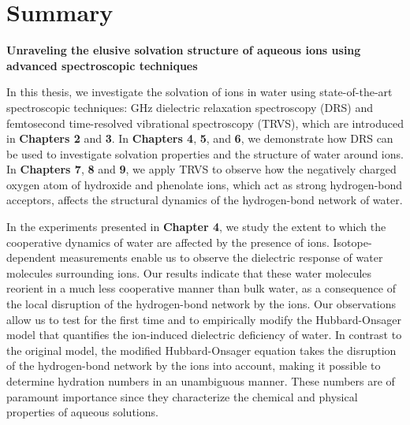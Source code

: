 
\chapter*{Summary}


\begin{center}
	\textcolor{SchoolColor}{\Titulosize\bfseries Unraveling the elusive solvation structure of aqueous ions using advanced spectroscopic techniques} \normalsize \\
	\vspace*{9pt}
\end{center}


In this thesis, we investigate the solvation of ions in water using state-of-the-art spectroscopic techniques: GHz dielectric relaxation spectroscopy (DRS) and femtosecond time-resolved vibrational spectroscopy (TRVS), which are introduced in \textbf{Chapters 2} and \textbf{3}. In \textbf{Chapters 4}, \textbf{5}, and \textbf{6}, we demonstrate how DRS can be used to investigate solvation properties and the structure of water around ions. In \textbf{Chapters 7}, \textbf{8} and \textbf{9}, we apply TRVS to observe how the negatively charged oxygen atom of hydroxide and phenolate ions, which act as strong hydrogen-bond acceptors, affects the structural dynamics of the hydrogen-bond network of water.


In the experiments presented in \textbf{Chapter 4}, we study the extent to which the cooperative dynamics of water are affected by the presence of ions. Isotope-dependent measurements enable us to observe the dielectric response of water molecules surrounding ions. Our results indicate that these water molecules reorient in a much less cooperative manner than bulk water, as a consequence of the local disruption of the hydrogen-bond network by the ions. Our observations allow us to test for the first time and to empirically modify the Hubbard-Onsager model that quantifies the ion-induced dielectric deficiency of water. In contrast to the original model, the modified Hubbard-Onsager equation takes the disruption of the hydrogen-bond network by the ions into account, making it possible to determine hydration numbers in an unambiguous manner. These numbers are of paramount importance since they characterize the chemical and physical properties of aqueous solutions. 


